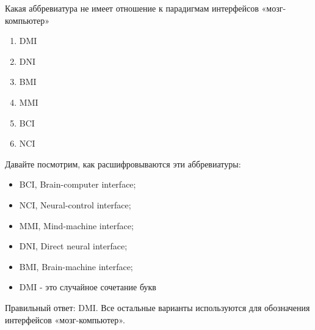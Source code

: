 
Какая аббревиатура не имеет отношение к парадигмам интерфейсов «мозг-компьютер»

\begin{enumerate}
    \item DMI
    \item DNI
    \item BMI
    \item MMI
    \item BCI
    \item NCI
\end{enumerate}

\explanationSection

Давайте посмотрим, как расшифровываются эти аббревиатуры:
\begin{itemize}
    \item BCI, Brain-computer interface;
    \item NCI, Neural-control interface;
    \item MMI, Mind-machine interface;
    \item DNI, Direct neural interface;
    \item BMI, Brain-machine interface;
    \item DMI - это случайное сочетание букв
\end{itemize}

Правильный ответ: DMI. Все остальные варианты используются для обозначения интерфейсов «мозг-компьютер».

